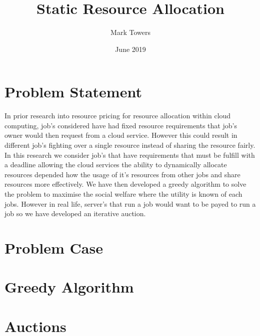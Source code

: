 \documentclass[fleqn]{article}
\title{Static Resource Allocation}
\author{Mark Towers}
\date{June 2019}
\begin{document}
\maketitle

\section{Problem Statement}\label{sec:problem-statement}
In prior research into resource pricing for resource allocation within cloud computing, job's considered have had
fixed resource requirements that job's owner would then request from a cloud service. However this could result in
different job's fighting over a single resource instead of sharing the resource fairly.
In this research we consider job's that have requirements that must be fulfill with a deadline allowing the
cloud services the ability to dynamically allocate resources depended how the usage of it's resources from other jobs
and share resources more effectively. We have then developed a greedy algorithm to solve the problem to maximise the
social welfare where the utility is known of each jobs. However in real life, server's that run a job would want
to be payed to run a job so we have developed an iterative auction. \\

\section{Problem Case}\label{sec:problem-case}


\section{Greedy Algorithm}\label{sec:greedy-algorithm}


\section{Auctions}\label{sec:auction-idea}

\end{document}
